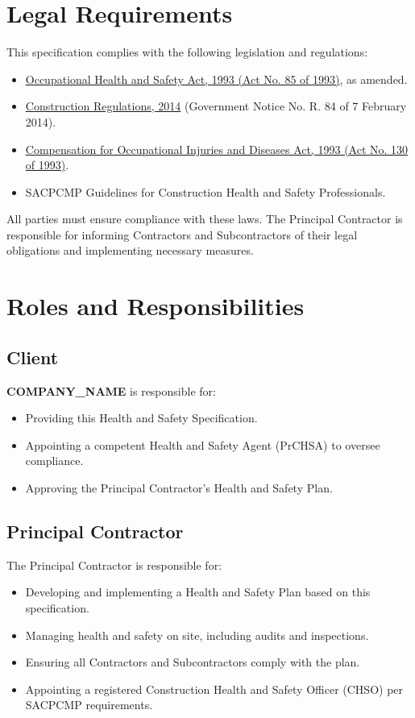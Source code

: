 \documentclass[11pt]{article}
\newcommand{\clientName}{{{COMPANY_NAME}}}
\begin{document}
\section{Legal Requirements}
This specification complies with the following legislation and regulations:
\begin{itemize}
  \item \href{https://www.gov.za/documents/occupational-health-and-safety-act}{Occupational Health and Safety Act, 1993 (Act No. 85 of 1993)}, as amended.
  \item \href{https://www.gov.za/documents/occupational-health-and-safety-act-construction-regulations-2014-7-feb-2014-0000}{Construction Regulations, 2014} (Government Notice No. R. 84 of 7 February 2014).
  \item \href{https://www.gov.za/documents/compensation-occupational-injuries-and-diseases-act}{Compensation for Occupational Injuries and Diseases Act, 1993 (Act No. 130 of 1993)}.
  \item SACPCMP Guidelines for Construction Health and Safety Professionals.
\end{itemize}
All parties must ensure compliance with these laws. The Principal Contractor is responsible for informing Contractors and Subcontractors of their legal obligations and implementing necessary measures.

\section{Roles and Responsibilities}
\subsection{Client}
\textbf{\clientName} is responsible for:
\begin{itemize}
  \item Providing this Health and Safety Specification.
  \item Appointing a competent Health and Safety Agent (PrCHSA) to oversee compliance.
  \item Approving the Principal Contractor’s Health and Safety Plan.
\end{itemize}

\subsection{Principal Contractor}
The Principal Contractor is responsible for:
\begin{itemize}
  \item Developing and implementing a Health and Safety Plan based on this specification.
  \item Managing health and safety on site, including audits and inspections.
  \item Ensuring all Contractors and Subcontractors comply with the plan.
  \item Appointing a registered Construction Health and Safety Officer (CHSO) per SACPCMP requirements.
\end{itemize}
\end{document}
